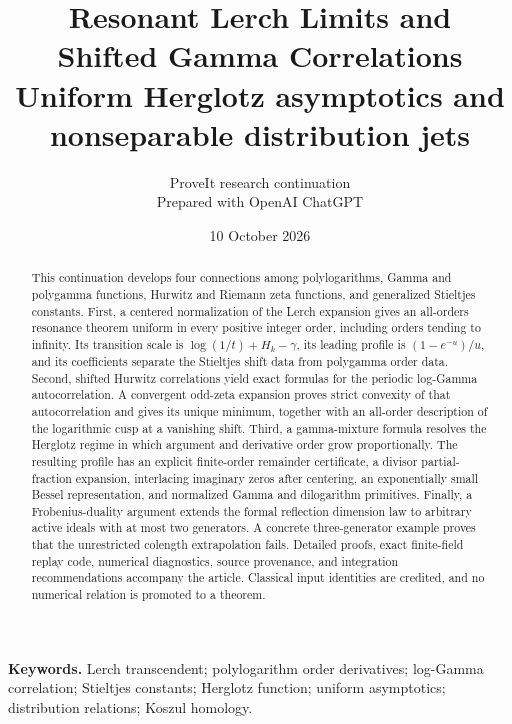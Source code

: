 \documentclass[11pt,letterpaper]{article}
\title{\color{inkblue}\LARGE\bfseries Resonant Lerch Limits and\\[3pt]
 Shifted Gamma Correlations\\[9pt]
 \large\normalfont Uniform Herglotz asymptotics and nonseparable distribution jets}
\author{ProveIt research continuation\\[2pt]
 \small Prepared with OpenAI ChatGPT}
\date{10 October 2026}
\theoremstyle{definition}
\theoremstyle{remark}
\numberwithin{equation}{section}
\begin{document}
\maketitle
\begin{abstract}
This continuation develops four connections among polylogarithms, Gamma and
polygamma functions, Hurwitz and Riemann zeta functions, and generalized
Stieltjes constants. First, a centered normalization of the Lerch expansion
gives an all-orders resonance theorem uniform in every positive integer order,
including orders tending to infinity. Its transition scale is
$\log(1/t)+H_k-\gamma$, its leading profile is $(1-e^{-u})/u$, and its
coefficients separate the Stieltjes shift data from polygamma order data.
Second, shifted Hurwitz correlations yield exact formulas for the periodic
log-Gamma autocorrelation. A convergent odd-zeta expansion proves strict
convexity of that autocorrelation and gives its unique minimum, together with
an all-order description of the logarithmic cusp at a vanishing shift.
Third, a gamma-mixture formula resolves the Herglotz regime in which argument
and derivative order grow proportionally. The resulting profile has an
explicit finite-order remainder certificate, a divisor partial-fraction
expansion, interlacing imaginary zeros after centering, an exponentially
small Bessel representation, and normalized Gamma and dilogarithm primitives.
Finally, a Frobenius-duality argument extends the formal reflection dimension
law to arbitrary active ideals with at most two generators. A concrete
three-generator example proves that the unrestricted colength extrapolation
fails. Detailed proofs, exact finite-field replay code, numerical diagnostics,
source provenance, and integration recommendations accompany the article.
Classical input identities are credited, and no numerical relation is
promoted to a theorem.
\end{abstract}
\vspace{5pt}
\noindent\textbf{Keywords.} Lerch transcendent; polylogarithm order derivatives;
log-Gamma correlation; Stieltjes constants; Herglotz function; uniform
asymptotics; distribution relations; Koszul homology.
\clearpage
\begingroup
\small
\tableofcontents
\endgroup
\clearpage








\end{document}
